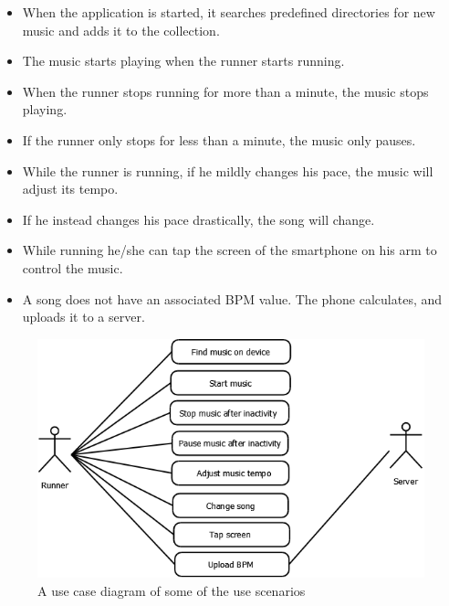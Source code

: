\begin{itemize}
	\item When the application is started, it searches predefined directories for new music and adds it to the collection.
	\item The music starts playing when the runner starts running.
	\item When the runner stops running for more than a minute, the music stops playing.
	\item If the runner only stops for less than a minute, the music only pauses.
	\item While the runner is running, if he mildly changes his pace, the music will adjust its tempo.
	\item If he instead changes his pace drastically, the song will change.
	\item While running he/she can tap the screen of the smartphone on his arm to control the music.
	\item A song does not have an associated BPM value. The phone calculates, and uploads it to a server.
\end{itemize}

\begin{figure}[h!]
  \caption{A use case diagram of some of the use scenarios}
  \centering
    \includegraphics[width=\textwidth]{Images/useCase.png}
\end{figure}

